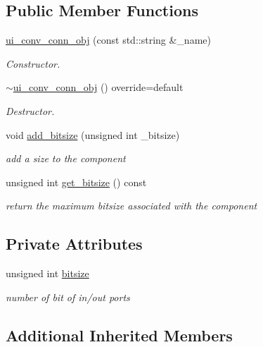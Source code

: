 \subsection*{Public Member Functions}
\begin{DoxyCompactItemize}
\item 
\hyperlink{classui__conv__conn__obj_a190bc2f0e639971e0daddf5e9807f3eb}{ui\+\_\+conv\+\_\+conn\+\_\+obj} (const std\+::string \&\+\_\+name)
\begin{DoxyCompactList}\small\item\em Constructor. \end{DoxyCompactList}\item 
\hyperlink{classui__conv__conn__obj_a9324f326d156144f97c1ad53085e9e93}{$\sim$ui\+\_\+conv\+\_\+conn\+\_\+obj} () override=default
\begin{DoxyCompactList}\small\item\em Destructor. \end{DoxyCompactList}\item 
void \hyperlink{classui__conv__conn__obj_aedc4522618e6d9f52ed197bac11ceb25}{add\+\_\+bitsize} (unsigned int \+\_\+bitsize)
\begin{DoxyCompactList}\small\item\em add a size to the component \end{DoxyCompactList}\item 
unsigned int \hyperlink{classui__conv__conn__obj_aeebaf8338bb9b0e65c37a504f531b6f6}{get\+\_\+bitsize} () const
\begin{DoxyCompactList}\small\item\em return the maximum bitsize associated with the component \end{DoxyCompactList}\end{DoxyCompactItemize}
\subsection*{Private Attributes}
\begin{DoxyCompactItemize}
\item 
unsigned int \hyperlink{classui__conv__conn__obj_a93d49404d4f4b710b7d8fb9d5aa4f0dc}{bitsize}
\begin{DoxyCompactList}\small\item\em number of bit of in/out ports \end{DoxyCompactList}\end{DoxyCompactItemize}
\subsection*{Additional Inherited Members}


